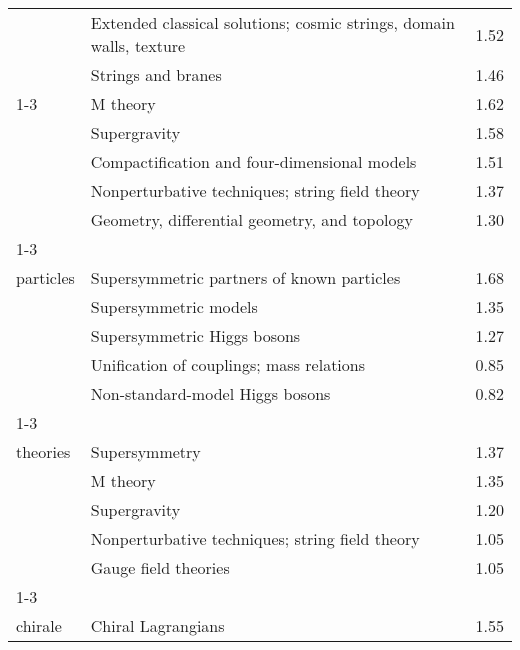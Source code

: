 \begin{longtable}[H]{p{}|p{}|p{}}
                                        & Extended classical solutions; cosmic strings, domain walls, texture &  1.52 \\
                                        & Strings and branes &  1.46 \\
\cline{1-3}
\multirow{5}{*}{\begin{tabular}{l}Supergravity\end{tabular}} & M theory &  1.62 \\
                                        & Supergravity &  1.58 \\
                                        & Compactification and four-dimensional models &  1.51 \\
                                        & Nonperturbative techniques; string field theory &  1.37 \\
                                        & Geometry, differential geometry, and topology &  1.30 \\
\cline{1-3}
\multirow{5}{*}{\begin{tabular}{l}Supersymmetric\\ particles\end{tabular}} & Supersymmetric partners of known particles &  1.68 \\
                                        & Supersymmetric models &  1.35 \\
                                        & Supersymmetric Higgs bosons &  1.27 \\
                                        & Unification of couplings; mass relations &  0.85 \\
                                        & Non-standard-model Higgs bosons &  0.82 \\
\cline{1-3}
\multirow{5}{*}{\begin{tabular}{l}Supersymmetric\\ theories\end{tabular}} & Supersymmetry &  1.37 \\
                                        & M theory &  1.35 \\
                                        & Supergravity &  1.20 \\
                                        & Nonperturbative techniques; string field theory &  1.05 \\
                                        & Gauge field theories &  1.05 \\
\cline{1-3}
\multirow{5}{*}{\begin{tabular}{l}Symétrie\\ chirale\end{tabular}} & Chiral Lagrangians &  1.55 \\

\end{longtable}
